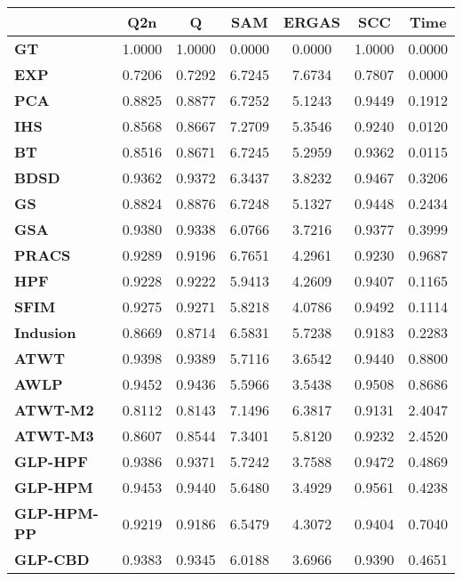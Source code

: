 \begin{tabular}{|l|c|c|c|c|c|c|}
\hline
&\textbf{Q2n}&\textbf{Q}&\textbf{SAM}&\textbf{ERGAS}&\textbf{SCC}&\textbf{Time}\\\hline
\textbf{GT}&1.0000&1.0000&0.0000&0.0000&1.0000&0.0000\\\hline
\textbf{EXP}&0.7206&0.7292&6.7245&7.6734&0.7807&0.0000\\\hline
\textbf{PCA}&0.8825&0.8877&6.7252&5.1243&0.9449&0.1912\\\hline
\textbf{IHS}&0.8568&0.8667&7.2709&5.3546&0.9240&0.0120\\\hline
\textbf{BT}&0.8516&0.8671&6.7245&5.2959&0.9362&0.0115\\\hline
\textbf{BDSD}&0.9362&0.9372&6.3437&3.8232&0.9467&0.3206\\\hline
\textbf{GS}&0.8824&0.8876&6.7248&5.1327&0.9448&0.2434\\\hline
\textbf{GSA}&0.9380&0.9338&6.0766&3.7216&0.9377&0.3999\\\hline
\textbf{PRACS}&0.9289&0.9196&6.7651&4.2961&0.9230&0.9687\\\hline
\textbf{HPF}&0.9228&0.9222&5.9413&4.2609&0.9407&0.1165\\\hline
\textbf{SFIM}&0.9275&0.9271&5.8218&4.0786&0.9492&0.1114\\\hline
\textbf{Indusion}&0.8669&0.8714&6.5831&5.7238&0.9183&0.2283\\\hline
\textbf{ATWT}&0.9398&0.9389&5.7116&3.6542&0.9440&0.8800\\\hline
\textbf{AWLP}&0.9452&0.9436&5.5966&3.5438&0.9508&0.8686\\\hline
\textbf{ATWT-M2}&0.8112&0.8143&7.1496&6.3817&0.9131&2.4047\\\hline
\textbf{ATWT-M3}&0.8607&0.8544&7.3401&5.8120&0.9232&2.4520\\\hline
\textbf{GLP-HPF}&0.9386&0.9371&5.7242&3.7588&0.9472&0.4869\\\hline
\textbf{GLP-HPM}&0.9453&0.9440&5.6480&3.4929&0.9561&0.4238\\\hline
\textbf{GLP-HPM-PP}&0.9219&0.9186&6.5479&4.3072&0.9404&0.7040\\\hline
\textbf{GLP-CBD}&0.9383&0.9345&6.0188&3.6966&0.9390&0.4651\\\hline
\end{tabular}
